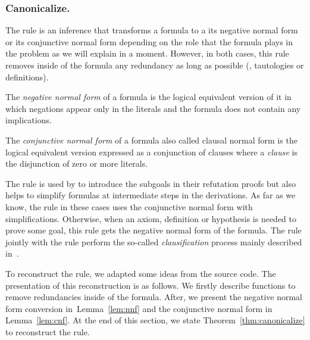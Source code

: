 \documentclass[../../main.tex]{subfiles}
\begin{document}
\subsubsection{Canonicalize.}
\label{sssec:canonicalize}

The \canonicalize rule is an inference that transforms a formula to a its
negative normal form or its conjunctive normal form depending on the role that
the formula plays in the problem as we will explain in a moment. However, in
both cases, this rule removes inside of the formula  any redundancy as long as
possible (\ie, tautologies or definitions).

\begin{mydefinition}
The \emph{negative normal form} of a formula is the logical equivalent version of it
in which negations appear only in the literals and the formula does not
contain any implications.

\end{mydefinition}

\begin{mydefinition}

The \emph{conjunctive normal form} of a formula also called clausal normal form
is the logical equivalent version expressed as a conjunction of clauses where
a \emph{clause} is the disjunction of zero or more literals.

\end{mydefinition}

The \canonicalize rule is used by \Metis to introduce the subgoals in their
refutation proofs but also helps to simplify formulas at intermediate steps in
the derivations. As far as we know, the \canonicalize rule in these cases uses
the conjunctive normal form with simplifications. Otherwise, when an axiom,
definition or hypothesis is needed to prove some goal, this rule gets the
negative normal form of the formula. The \canonicalize rule jointly with the
\clausify rule perform the so-called \emph{clausification} process mainly
described in~\cite{Sutcliffe1996}.

To reconstruct the \canonicalize rule, we adapted some ideas from the \Metis
source code. The presentation of this reconstruction is as follows. We firstly
describe functions to remove redundancies inside of the formula. After, we
present the negative normal form conversion in~Lemma~\ref{lem:nnf} and the
conjunctive normal form in Lemma~\ref{lem:cnf}. At the end of this section, we
state Theorem~\ref{thm:canonicalize} to reconstruct the \canonicalize rule.
\end{document}

